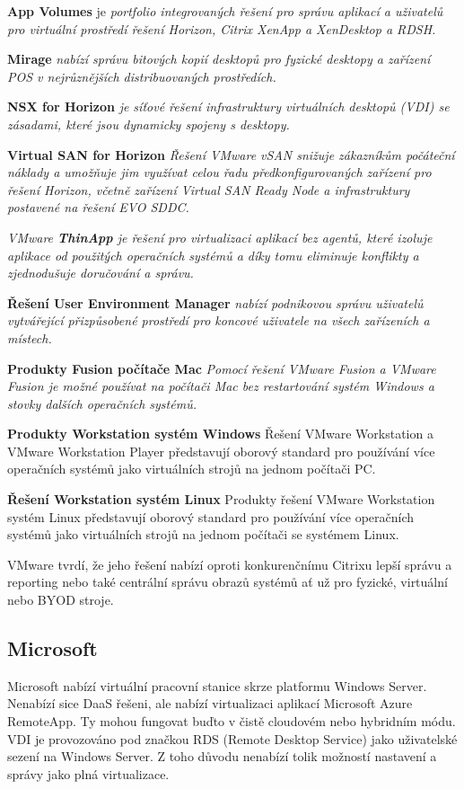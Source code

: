 \textbf{App Volumes} je \textit{portfolio integrovaných řešení pro správu aplikací a uživatelů pro virtuální prostředí řešení Horizon, Citrix XenApp a XenDesktop a RDSH.}

\textbf{Mirage} \textit{nabízí správu bitových kopií desktopů pro fyzické desktopy a zařízení POS v nejrůznějších distribuovaných prostředích.}

\textbf{NSX for Horizon} \textit{je síťové řešení infrastruktury virtuálních desktopů (VDI) se zásadami, které jsou dynamicky spojeny s desktopy.}

\textbf{Virtual SAN for Horizon} \textit{Řešení VMware vSAN snižuje zákazníkům počáteční náklady a umožňuje jim využívat celou řadu předkonfigurovaných zařízení pro řešení Horizon, včetně zařízení Virtual SAN Ready Node a infrastruktury postavené na řešení EVO SDDC.}

\textit{VMware \textbf{ThinApp} je řešení pro virtualizaci aplikací bez agentů, které izoluje aplikace od použitých operačních systémů a díky tomu eliminuje konflikty a zjednodušuje doručování a správu.}

\textbf{Řešení User Environment Manager} \textit{nabízí podnikovou správu uživatelů vytvářející přizpůsobené prostředí pro koncové uživatele na všech zařízeních a místech.}

\textbf{Produkty Fusion počítače Mac} \textit{Pomocí řešení VMware Fusion a VMware Fusion je možné používat na počítači Mac bez restartování systém Windows a stovky dalších operačních systémů.}

\textbf{Produkty Workstation systém Windows} Řešení VMware Workstation a VMware Workstation Player představují oborový standard pro používání více operačních systémů jako virtuálních strojů na jednom počítači PC.

\textbf{Řešení Workstation systém Linux} Produkty řešení VMware Workstation systém Linux představují oborový standard pro používání více operačních systémů jako virtuálních strojů na jednom počítači se systémem Linux.

VMware tvrdí, že jeho řešení nabízí oproti konkurenčnímu Citrixu lepší správu a reporting nebo také centrální správu obrazů systémů ať už pro fyzické, virtuální nebo BYOD stroje. 


\subsection{Microsoft}
Microsoft nabízí virtuální pracovní stanice skrze platformu Windows Server. Nenabízí sice DaaS řešeni, ale nabízí virtualizaci aplikací Microsoft Azure RemoteApp. Ty mohou fungovat buďto v čistě cloudovém nebo hybridním módu. VDI je provozováno pod značkou RDS (Remote Desktop Service) jako uživatelské sezení na Windows Server. Z toho důvodu nenabízí tolik možností nastavení a správy jako plná virtualizace. 

